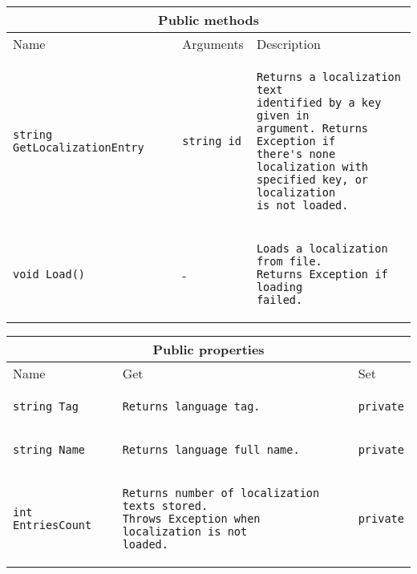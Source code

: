 \documentclass[a4paper]{report}
\begin{document}
\bigskip

\begin{tabular}{|l|l|l|}
\hline
\multicolumn{3}{|c|}{Public methods}\\
\hline
Name & Arguments & Description\\
\hline
\begin{lstlisting}[style=sharpc]
string GetLocalizationEntry
\end{lstlisting}&
\begin{lstlisting}[style=sharpc]
string id
\end{lstlisting}&
\begin{lstlisting}[style=sharpc]
Returns a localization text
identified by a key given in
argument. Returns Exception if
there's none localization with
specified key, or localization
is not loaded.
\end{lstlisting}\\
\hline
\begin{lstlisting}[style=sharpc]
void Load()
\end{lstlisting}&
-&
\begin{lstlisting}[style=sharpc]
Loads a localization from file.
Returns Exception if loading
failed.
\end{lstlisting}\\
\hline
\end{tabular}

\bigskip

\begin{tabular}{|l|l|l|}
\hline
\multicolumn{3}{|c|}{Public properties}\\
\hline
Name & Get & Set\\
\hline
\begin{lstlisting}[style=sharpc]
string Tag
\end{lstlisting}&
\begin{lstlisting}[style=sharpc]
Returns language tag.
\end{lstlisting}&
\begin{lstlisting}[style=sharpc]
private
\end{lstlisting}\\
\hline
\begin{lstlisting}[style=sharpc]
string Name
\end{lstlisting}&
\begin{lstlisting}[style=sharpc]
Returns language full name.
\end{lstlisting}&
\begin{lstlisting}[style=sharpc]
private
\end{lstlisting}\\
\hline
\begin{lstlisting}[style=sharpc]
int EntriesCount
\end{lstlisting}&
\begin{lstlisting}[style=sharpc]
Returns number of localization texts stored.
Throws Exception when localization is not
loaded.
\end{lstlisting}&
\begin{lstlisting}[style=sharpc]
private
\end{lstlisting}\\
\hline
\end{tabular}
\end{document}
